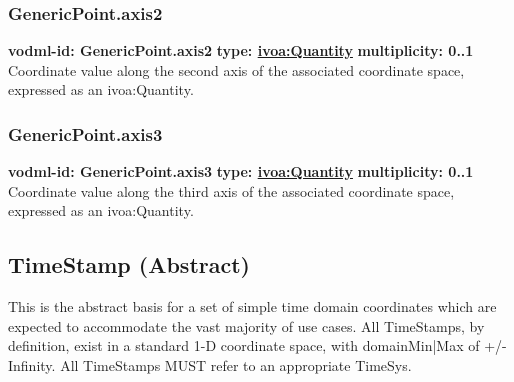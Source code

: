     \subsubsection{GenericPoint.axis2}
      \textbf{vodml-id: GenericPoint.axis2} \newline
      \textbf{type: \hyperref[sect:ivoa]{ivoa:Quantity}} \newline
      \textbf{multiplicity: 0..1} \newline 
      Coordinate value along the second axis of the associated coordinate space, expressed as an ivoa:Quantity.

    \subsubsection{GenericPoint.axis3}
      \textbf{vodml-id: GenericPoint.axis3} \newline
      \textbf{type: \hyperref[sect:ivoa]{ivoa:Quantity}} \newline
      \textbf{multiplicity: 0..1} \newline 
      Coordinate value along the third axis of the associated coordinate space, expressed as an ivoa:Quantity.


  \subsection{TimeStamp (Abstract)}
  \label{sect:TimeStamp}
    This is the abstract basis for a set of simple time domain coordinates which are expected to accommodate the vast majority of use cases. All TimeStamps, by definition, exist in a standard 1-D coordinate space, with domainMin|Max of +/-Infinity. All TimeStamps MUST refer to an appropriate TimeSys.

